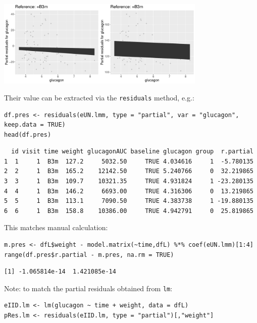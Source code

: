 \documentclass[12pt]{article}
\begin{document}
\begin{center}
\includegraphics[width=0.75\textwidth]{./figures/fit-pres.pdf}
\end{center}

Their value can be extracted via the \texttt{residuals} method, e.g.:
\lstset{language=r,label= ,caption= ,captionpos=b,numbers=none}
\begin{lstlisting}
df.pres <- residuals(eUN.lmm, type = "partial", var = "glucagon", keep.data = TRUE)
head(df.pres)
\end{lstlisting}

\begin{verbatim}
  id visit time weight glucagonAUC baseline glucagon group  r.partial
1  1     1  B3m  127.2     5032.50     TRUE 4.034616     1  -5.780135
2  2     1  B3m  165.2    12142.50     TRUE 5.240766     0  32.219865
3  3     1  B3m  109.7    10321.35     TRUE 4.931824     1 -23.280135
4  4     1  B3m  146.2     6693.00     TRUE 4.316306     0  13.219865
5  5     1  B3m  113.1     7090.50     TRUE 4.383738     1 -19.880135
6  6     1  B3m  158.8    10386.00     TRUE 4.942791     0  25.819865
\end{verbatim}


This matches manual calculation:
\lstset{language=r,label= ,caption= ,captionpos=b,numbers=none}
\begin{lstlisting}
m.pres <- dfL$weight - model.matrix(~time,dfL) %*% coef(eUN.lmm)[1:4]
range(df.pres$r.partial - m.pres, na.rm = TRUE)
\end{lstlisting}

\begin{verbatim}
[1] -1.065814e-14  1.421085e-14
\end{verbatim}


Note: to match the partial residuals obtained from \texttt{lm}:
\lstset{language=r,label= ,caption= ,captionpos=b,numbers=none}
\begin{lstlisting}
eIID.lm <- lm(glucagon ~ time + weight, data = dfL)
pRes.lm <- residuals(eIID.lm, type = "partial")[,"weight"]
\end{lstlisting}
\end{document}

